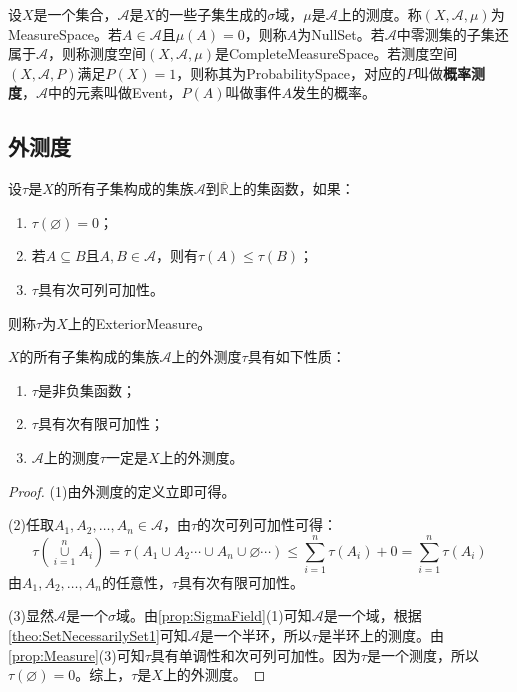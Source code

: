 \begin{definition}
	设$X$是一个集合，$\mathscr{A}$是$X$的一些子集生成的$\sigma$域，$\mu$是$\mathscr{A}$上的测度。称$(X,\mathscr{A},\mu)$为\gls{MeasureSpace}。若$A\in \mathscr{A}$且$\mu(A)=0$，则称$A$为\gls{NullSet}。若$\mathscr{A}$中零测集的子集还属于$\mathscr{A}$，则称测度空间$(X,\mathscr{A},\mu)$是\gls{CompleteMeasureSpace}。若测度空间$(X,\mathscr{A},P)$满足$P(X)=1$，则称其为\gls{ProbabilitySpace}，对应的$P$叫做\textbf{概率测度}，$\mathscr{A}$中的元素叫做\gls{Event}，$P(A)$叫做事件$A$发生的概率。
\end{definition}

\subsection{外测度}
\begin{definition}
	设$\tau$是$X$的所有子集构成的集族$\mathscr{A}$到$\overline{\mathbb{R}}$上的集函数，如果：
	\begin{enumerate}
		\item $\tau(\varnothing)=0$；
		\item 若$A\subseteq B$且$A,B\in\mathscr{A}$，则有$\tau(A)\leqslant\tau(B)$；
		\item $\tau$具有次可列可加性。
	\end{enumerate}
	则称$\tau$为$X$上的\gls{ExteriorMeasure}。
\end{definition}
\begin{property}\label{prop:ExteriorMeasure}
	$X$的所有子集构成的集族$\mathscr{A}$上的外测度$\tau$具有如下性质：
	\begin{enumerate}
		\item $\tau$是非负集函数；
		\item $\tau$具有次有限可加性；
		\item $\mathscr{A}$上的测度$\tau$一定是$X$上的外测度。
	\end{enumerate}
\end{property}
\begin{proof}
	(1)由外测度的定义立即可得。\par
	(2)任取$A_1,A_2,\dots,A_n\in\mathscr{A}$，由$\tau$的次可列可加性可得：
	\begin{equation*}
		\tau\left(\underset{i=1}{\overset{n}{\cup}}A_i\right)=\tau(A_1\cup A_2\cdots\cup A_n\cup\varnothing\cdots)\leqslant\sum_{i=1}^{n}\tau(A_i)+0=\sum_{i=1}^{n}\tau(A_i)
	\end{equation*}
	由$A_1,A_2,\dots,A_n$的任意性，$\tau$具有次有限可加性。\par
	(3)显然$\mathscr{A}$是一个$\sigma$域。由\cref{prop:SigmaField}(1)可知$\mathscr{A}$是一个域，根据\cref{theo:SetNecessarilySet1}可知$\mathscr{A}$是一个半环，所以$\tau$是半环上的测度。由\cref{prop:Measure}(3)可知$\tau$具有单调性和次可列可加性。因为$\tau$是一个测度，所以$\tau(\varnothing)=0$。综上，$\tau$是$X$上的外测度。
\end{proof}
